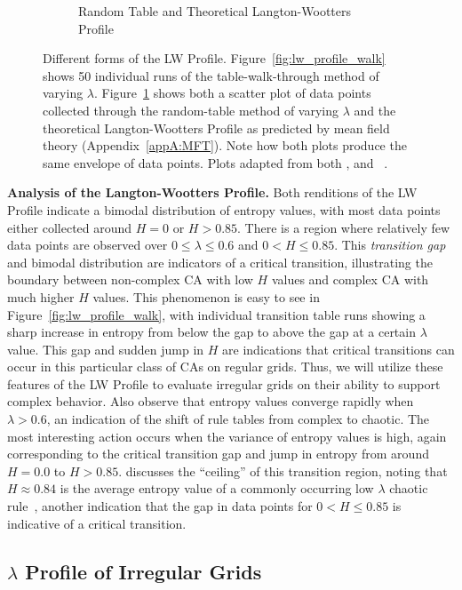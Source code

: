 \documentclass[a4paper,11pt]{article}
\begin{document}
\begin{figure}[htp]
\begin{subfigure}[t]{0.45\textwidth}
  \caption{Random Table and Theoretical Langton-Wootters Profile}
  \label{fig:lw_profile_rand}
  \end{subfigure}
\caption[The Langton-Wootters Profile]{
  Different forms of the LW Profile. Figure~\ref{fig:lw_profile_walk} shows 50 individual runs of the table-walk-through method of varying $\lambda$. Figure~\ref{fig:lw_profile_rand} shows both a scatter plot of data points collected through the random-table method of varying $\lambda$ and the theoretical Langton-Wootters Profile as predicted by mean field theory (Appendix~\ref{appA:MFT}). Note how both plots produce the same envelope of data points. Plots adapted from both \citeauthor{wo90}, and \citeauthor{la90}~\cite{la90,wo90}.
}
\label{fig:lw_profile}
\end{figure}

\medskip

\noindent \textbf{Analysis of the Langton-Wootters Profile.} Both renditions of the LW Profile indicate a bimodal distribution of entropy values, with most data points either collected around $H=0$ or $H > 0.85$. There is a region where relatively few data points are observed over $0 \le \lambda \le 0.6$ and $0 < H \le 0.85$. This \textit{transition gap} and bimodal distribution are indicators of a critical transition, illustrating the boundary between non-complex CA with low $H$ values and complex CA with much higher $H$ values. This phenomenon is easy to see in Figure~\ref{fig:lw_profile_walk}, with individual transition table runs showing a sharp increase in entropy from below the gap to above the gap at a certain $\lambda$ value. This gap and sudden jump in $H$ are indications that critical transitions can occur in this particular class of CAs on regular grids. Thus, we will utilize these features of the LW Profile to evaluate irregular grids on their ability to support complex behavior.
Also observe that entropy values converge rapidly when $\lambda > 0.6$, an indication of the shift of rule tables from complex to chaotic. The most interesting action occurs when the variance of entropy values is high, again corresponding to the critical transition gap and jump in entropy from around $H=0.0$ to $H > 0.85$. \citeauthor{la90} discusses the ``ceiling'' of this transition region, noting that $H \approx 0.84$ is the average entropy value of a commonly occurring low $\lambda$ chaotic rule~\cite{la90}, another indication that the gap in data points for $0 < H \le 0.85$ is indicative of a critical transition.

\subsection{$\lambda$ Profile of Irregular Grids}
\end{document}
